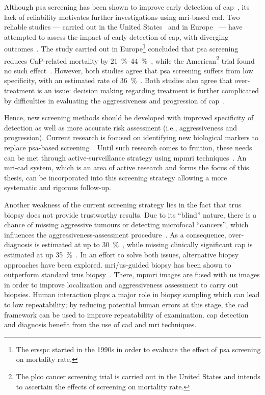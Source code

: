 Although \ac{psa} screening has been shown to improve early detection of \ac{cap}~\cite{Chou2011}, its lack of reliability motivates further investigations using \ac{mri}-based \ac{cad}.
Two reliable studies --- carried out in the United States~\cite{Andriole2009} and in Europe~\cite{Schroeder2012, Hugosson2010} --- have attempted to assess the impact of early detection of \ac{cap}, with diverging outcomes~\cite{Chou2011,Heidenreich2013}.
The study carried out in Europe\footnote{The \ac{ersspc} started in the 1990s in order to evaluate the effect of \ac{psa} screening on mortality rate.} concluded that \ac{psa} screening reduces CaP-related mortality by \SIrange{21}{44}{\percent}~\cite{Schroeder2012, Hugosson2010}, while the American\footnote{The \ac{plco} cancer screening trial is carried out in the United States and intends to ascertain the effects of screening on mortality rate.} trial found no such effect~\cite{Andriole2009}.
However, both studies agree that \ac{psa} screening suffers from low specificity, with an estimated rate of \SI{36}{\percent}~\cite{Schroder2008}.
Both studies also agree that over-treatment is an issue: decision making regarding treatment is further complicated by difficulties in evaluating the aggressiveness and progression of \ac{cap}~\cite{Delpierre2013}. 

Hence, new screening methods should be developed with improved specificity of detection as well as more accurate risk assessment (i.e., aggressiveness and progression).
Current research is focused on identifying new biological markers to replace \ac{psa}-based screening~\cite{Bourdoumis2010,Morgan2011,Brenner2013}.
Until such research comes to fruition, these needs can be met through active-surveillance strategy using \ac{mpmri} techniques~\cite{Hoeks2011,Moore2013}.
An \ac{mri}-\acs{cad} system, which is an area of active research and forms the focus of this thesis, can be incorporated into this screening strategy allowing a more systematic and rigorous follow-up.

Another weakness of the current screening strategy lies in the fact that \ac{trus} biopsy does not provide trustworthy results.
Due to its ``blind'' nature, there is a chance of missing aggressive tumours or detecting microfocal ``cancers'', which influences the aggressiveness-assessment procedure~\cite{Noguchi2001}.
As a consequence, over-diagnosis is estimated at up to \SI{30}{\percent}~\cite{Haas2007}, while missing clinically significant \ac{cap} is estimated at up \SI{35}{\percent}~\cite{Taira2010}.
In an effort to solve both issues, alternative biopsy approaches have been explored.
\ac{mri}/\ac{us}-guided biopsy has been shown to outperform standard \ac{trus} biopsy~\cite{Delongchamps2013}.
There, \ac{mpmri} images are fused with \ac{us} images in order to improve localization and aggressiveness assessment to carry out biopsies.
Human interaction plays a major role in biopsy sampling which can lead to low repeatability; by reducing potential human errors at this stage, the \acs{cad} framework can be used to improve repeatability of examination.
\ac{cap} detection and diagnosis benefit from the use of \acs{cad} and \ac{mri} techniques.

